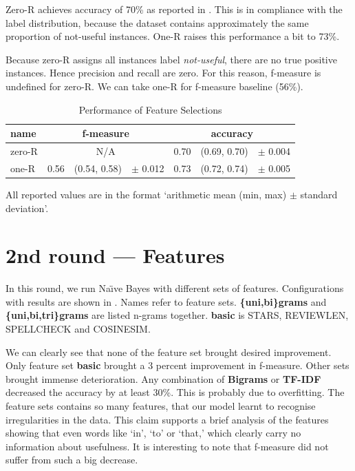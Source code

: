 Zero-R achieves accuracy of 70\% as reported in .
This is in compliance with the label distribution,
because the dataset contains approximately the same proportion of not-useful instances.
One-R raises this performance a bit to 73\%.

Because zero-R assigns all instances label \textit{not-useful},
there are no true positive instances.
Hence precision and recall are zero.
For this reason, f-measure is undefined for zero-R.
We can take one-R for f-measure baseline (56\%).

\begin{table}[h!]

\centering
\begin{tabular}{lr@{~}r@{~}rr@{~}r@{~}r}
\toprule
\textbf{name}	& \multicolumn{3}{c}{\textbf{f-measure}} & \multicolumn{3}{c}{\textbf{accuracy}} \\
\midrule
zero-R & \multicolumn{3}{c}{N/A} & 0.70 & (0.69, 0.70) & $\pm$ 0.004 \\
one-R & 0.56 & (0.54, 0.58) & $\pm$ 0.012 & 0.73 & (0.72, 0.74) & $\pm$ 0.005 \\

\bottomrule
\end{tabular}

\caption{Performance of Feature Selections}\label{tab:base_perf}
All reported values are in the format `arithmetic mean (min, max) $\pm$ standard deviation'.
\end{table}

\section{2nd round --- Features}

In this round, we run Na\"{\i}ve Bayes with different sets of features.
Configurations with results are shown in .
Names refer to feature sets.
\textbf{\{uni,bi\}grams} and \textbf{\{uni,bi,tri\}grams} are listed n-grams together.
\textbf{basic} is STARS, REVIEWLEN, SPELLCHECK and COSINESIM.

We can clearly see that none of the feature set brought desired improvement.
Only feature set \textbf{basic} brought a 3 percent improvement in f-measure.
Other sets brought immense deterioration.
Any combination of \textbf{Bigrams} or \textbf{TF-IDF} decreased the accuracy by at least 30\%.
This is probably due to overfitting.
The feature sets contains so many features, that our model learnt to recognise
irregularities in the data.
This claim supports a brief analysis of the features showing that
even words like `in', `to' or `that,' which clearly carry no information about usefulness.
It is interesting to note that f-measure did not suffer from such a big decrease.




